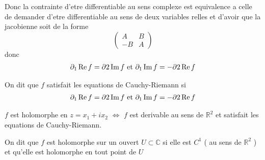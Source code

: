 \documentclass[../main.tex]{subfiles}
\begin{document}
Donc la contrainte d'etre differentiable au sens complexe est equivalence a celle de demander d'etre differentiable au sens de deux variables relles et d'avoir que la jacobienne soit de la forme
\[ 
\begin{pmatrix}
	A & B \\
	-B & A
\end{pmatrix} 
\]
donc
\begin{align*}
\partial_1 \operatorname{Re} f = \partial 2 \operatorname{Im} f \text{ et } \partial_1\operatorname{Im} f = - \partial 2 \operatorname{Re} f
\end{align*}
\begin{defn}
On dit que $f$ satisfait les equations de Cauchy-Riemann si 
\begin{align*}
\partial_1 \operatorname{Re} f = \partial 2 \operatorname{Im} f \text{ et } \partial_1\operatorname{Im} f = - \partial 2 \operatorname{Re} f
\end{align*}
\end{defn}
\begin{propo}
$f$ est holomorphe en $z= x_1 + i x_2$ $\iff$ $f$ est derivable au sens de $ \mathbb{R}^{2}$ et satisfait les equations de Cauchy-Riemann.
\end{propo}
\begin{defn}
	On dit que $f$ est holomorphe sur un ouvert $ U \subset \mathbb{C}$ si elle est $C^{1}$ ( au sens de $ \mathbb{R}^{2}$ ) et qu'elle est holomorphe en tout point de $ U$ 	
\end{defn}
\end{document}
